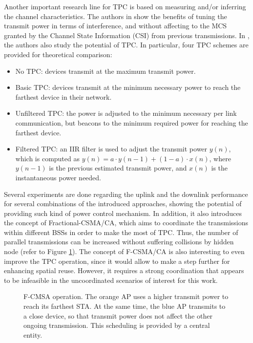 \documentclass[12pt, a4paper,twoside]{tesi_upf}
\begin{document}
				Another important research line for TPC is based on measuring and/or inferring the channel characteristics. The authors in \cite{chaves2014adaptive} show the benefits of tuning the transmit power in terms of interference, and without affecting to the MCS granted by the Channel State Information (CSI) from previous transmissions. In \cite{oteri2013advanced}, the authors also study the potential of TPC. In particular, four TPC schemes are provided for theoretical comparison:
				\begin{itemize}
					\item No TPC: devices transmit at the maximum transmit power.
					\item Basic TPC: devices transmit at the minimum necessary power to reach the farthest device in their network.
					\item Unfiltered TPC: the power is adjusted to the minimum necessary per link communication, but beacons to the minimum required power for reaching the farthest device.
					\item Filtered TPC: an IIR filter is used to adjust the transmit power $y(n)$, which is computed as $y(n) = a \cdot y(n-1) + (1-a) \cdot x(n)$, where  $y(n-1)$ is the previous estimated transmit power, and $x(n)$ is the instantaneous power needed.
				\end{itemize}  
				Several experiments are done regarding the uplink and the downlink performance for several combinations of the introduced approaches, showing the potential of providing such kind of power control mechanism. In addition, it also introduces the concept of Fractional-CSMA/CA, which aims to coordinate the transmissions within different BSSs in order to make the most of TPC. Thus, the number of parallel transmissions can be increased without suffering collisions by hidden node (refer to Figure \ref{fig:fcsma}). The concept of F-CSMA/CA is also interesting to even improve the TPC operation, since it would allow to make a step further for enhancing spatial reuse. However, it requires a strong coordination that appears to be infeasible in the uncoordinated scenarios of interest for this work.
				\begin{figure}[t!]
					\centering
					\caption{F-CMSA operation. The orange AP uses a higher transmit power to reach its farthest STA. At the same time, the blue AP transmits to a close device, so that transmit power does not affect the other ongoing transmission. This scheduling is provided by a central entity. }
					\label{fig:fcsma}
				\end{figure}	
			
\end{document}
